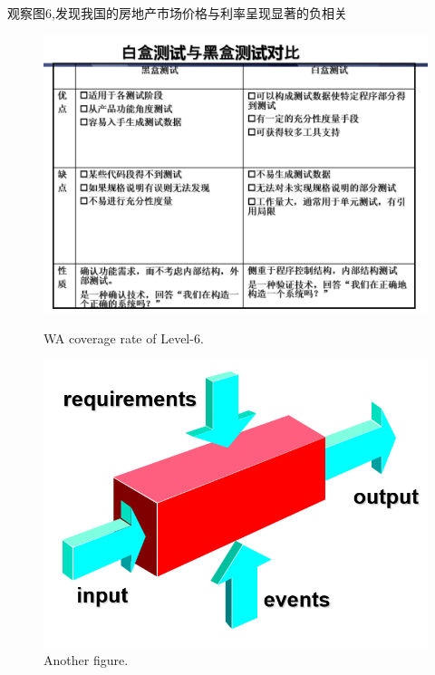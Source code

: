 \documentclass{ijclclp}
\begin{document}
观察图6,发现我国的房地产市场价格与利率呈现显著的负相关
\begin{figure}[h]
    \centering
    \begin{minipage}{0.45\textwidth}
        \centering
        \includegraphics[width=\textwidth]{img/图5.png}
        \caption{WA coverage rate of Level-6.}
        \label{fig:figure3}
    \end{minipage}
    \hfill
    \begin{minipage}{0.45\textwidth}
        \centering
        \includegraphics[width=\textwidth]{img/图6.png}
        \caption{Another figure.}
        \label{fig:figure4}
    \end{minipage}
\end{figure}
\end{document}
